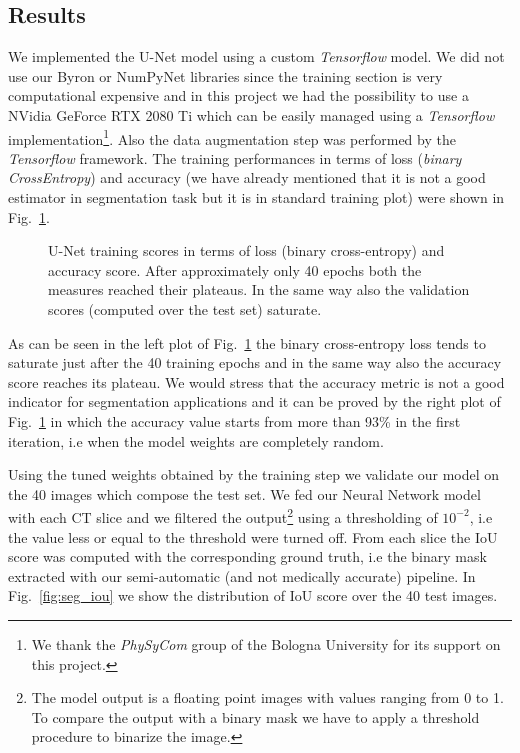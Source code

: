\documentclass{standalone}
\begin{document}
\subsection[Results]{Results}\label{segmentation:results}

We implemented the U-Net model using a custom \emph{Tensorflow} model.
We did not use our \textsf{Byron} or \textsf{NumPyNet} libraries since the training section is very computational expensive and in this project we had the possibility to use a NVidia GeForce RTX 2080 Ti which can be easily managed using a \emph{Tensorflow} implementation\footnote{
  We thank the \emph{PhySyCom} group of the Bologna University for its support on this project.
}.
Also the data augmentation step was performed by the \emph{Tensorflow} framework.
The training performances in terms of loss (\emph{binary CrossEntropy}) and accuracy (we have already mentioned that it is not a good estimator in segmentation task but it is  in standard training plot) were shown in Fig.~\ref{fig:seg_train}.

\begin{figure}[htbp]
\centering
\def\svgwidth{0.85\textwidth}

\caption{U-Net training scores in terms of loss (binary cross-entropy) and accuracy score.
After approximately only 40 epochs both the measures reached their plateaus.
In the same way also the validation scores (computed over the test set) saturate.
}
\label{fig:seg_train}
\end{figure}

As can be seen in the left plot of Fig.~\ref{fig:seg_train} the binary cross-entropy loss tends to saturate just after the 40 training epochs and in the same way also the accuracy score reaches its plateau.
We would stress that the accuracy metric is not a good indicator for segmentation applications and it can be proved by the right plot of Fig.~\ref{fig:seg_train} in which the accuracy value starts from more than 93\% in the first iteration, i.e when the model weights are completely random.

Using the tuned weights obtained by the training step we validate our model on the 40 images which compose the test set.
We fed our Neural Network model with each CT slice and we filtered the output\footnote{
  The model output is a floating point images with values ranging from 0 to 1.
  To compare the output with a binary mask we have to apply a threshold procedure to binarize the image.
} using a thresholding of $10^{-2}$, i.e the value less or equal to the threshold were turned off.
From each slice the IoU score was computed with the corresponding ground truth, i.e the binary mask extracted with our semi-automatic (and not medically accurate) pipeline.
In Fig.~\ref{fig:seg_iou} we show the distribution of IoU score over the 40 test images.
\end{document}
